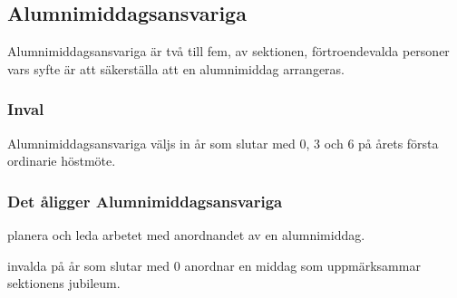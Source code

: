 \subsection{Alumnimiddagsansvariga}
Alumnimiddagsansvariga är två till fem, av sektionen, förtroendevalda personer vars syfte är att säkerställa att en alumnimiddag arrangeras.

\subsubsection{Inval}
Alumnimiddagsansvariga väljs in år som slutar med 0, 3 och 6 på årets första
ordinarie höstmöte.

\subsubsection{Det åligger Alumnimiddagsansvariga}
\begin{att}
  \item planera och leda arbetet med anordnandet av en alumnimiddag.
  \item invalda på år som slutar med 0 anordnar en middag som uppmärksammar sektionens jubileum.
\end{att}